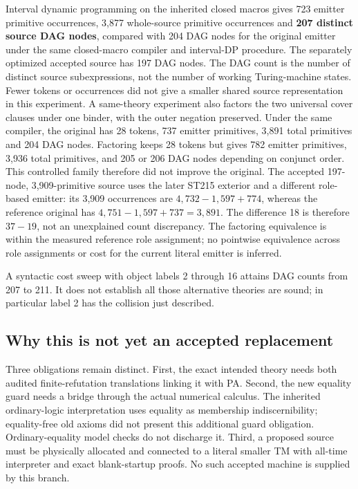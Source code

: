 Interval dynamic programming on the inherited closed macros gives 723 emitter
primitive occurrences, 3,877 whole-source primitive occurrences and
\textbf{207 distinct source DAG nodes}, compared with 204 DAG nodes for the original emitter under the same
closed-macro compiler and interval-DP procedure. The separately optimized
accepted source has 197 DAG nodes. The DAG count is the number of distinct source subexpressions,
not the number of working Turing-machine states. Fewer tokens or occurrences
did not give a smaller shared source representation in this experiment.
A same-theory experiment also factors the two universal cover clauses under
one binder, with the outer negation preserved. Under the same compiler, the
original has 28 tokens, 737 emitter primitives, 3,891 total primitives and 204
DAG nodes. Factoring keeps 28 tokens but gives 782 emitter primitives, 3,936
total primitives, and 205 or 206 DAG nodes depending on conjunct order. This
controlled family therefore did not improve the original. The accepted
197-node, 3,909-primitive source uses the later ST215 exterior and a different
role-based emitter: its 3,909 occurrences are $4,732-1,597+774$, whereas the
reference original has $4,751-1,597+737=3,891$. The difference 18 is therefore
$37-19$, not an unexplained count discrepancy. The factoring equivalence is
within the measured reference role assignment; no pointwise equivalence across
role assignments or cost for the current literal emitter is inferred.

A syntactic cost sweep with object labels 2 through 16 attains DAG counts from
207 to 211. It does not establish all those alternative theories are sound;
in particular label 2 has the collision just described.

\subsection{Why this is not yet an accepted replacement}
Three obligations remain distinct. First, the exact intended theory needs
both audited finite-refutation translations linking it with PA. Second, the
new equality guard needs a bridge through the actual numerical calculus.
The inherited ordinary-logic interpretation uses equality as membership
indiscernibility; equality-free old axioms did not present this additional
guard obligation. Ordinary-equality model checks do not discharge it.
Third, a proposed source must be physically allocated and connected to a
literal smaller TM with all-time interpreter and exact blank-startup proofs.
No such accepted machine is supplied by this branch.

